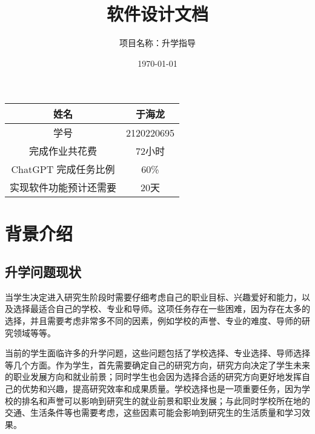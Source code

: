 \documentclass[UTF8]{ctexart}
\title{软件设计文档}
\author{项目名称：升学指导}
\date{\today}
\newcommand{\m}[1]{\textcolor{modify}{#1}}
\begin{document}
    \maketitle

    \begin{center}
        \begin{tabular}{|c|c|}
            \hline
            姓名 & 于海龙 \\	
            \hline
            学号 & 2120220695 \\	
            \hline
            完成作业共花费&72小时\\
            \hline
            ChatGPT 完成任务比例&60\%\\
            \hline
            实现软件功能预计还需要&20天\\
            \hline
        \end{tabular}

        \par
    \end{center}

    

    \newpage
    \tableofcontents
    \newpage
    
    \section{背景介绍}
    \subsection{升学问题现状}
    \par
    \m{当学生决定进入研究生阶段时需要仔细考虑自己的职业目标、兴趣爱好和能力，以及选择最适合自己的学校、专业和导师}。这项任务存在一些困难，因为存在太多的选择，并且需要考虑非常多不同的因素，例如学校的声誉、专业的难度、导师的研究领域等等。
    
    \par
    当前的学生面临许多的升学问题，这些问题包括了学校选择、专业选择、导师选择等几个方面。作为学生，首先需要确定自己的研究方向，\m{研究方向决定了学生未来的职业发展方向和就业前景}；\m{同时学生也会因为选择合适的研究方向更好地发挥自己的优势和兴趣，提高研究效率和成果质量}。学校选择也是一项重要任务，因为\m{学校的排名和声誉可以影响到研究生的就业前景和职业发展}；与此同时\m{学校所在地的交通、生活条件等也需要考虑，这些因素可能会影响到研究生的生活质量和学习效果}。
\end{document}
